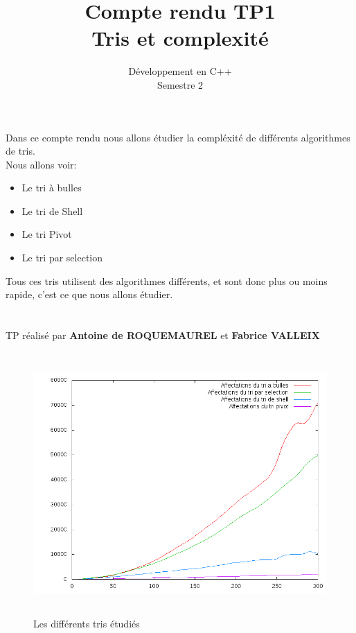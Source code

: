 \documentclass[12pt,a4paper,openany]{article}
\title{Compte rendu TP1\\ Tris et complexité}
\date{Développement en C++\\ Semestre 2\\}
\author{}
\begin{document}
	\maketitle
	Dans ce compte rendu nous allons étudier la compléxité de différents algorithmes de tris. \\	
	Nous allons voir: 
	\begin{itemize}
		\item Le tri à bulles
		\item Le tri de Shell
		\item Le tri Pivot
		\item Le tri par selection
	\end{itemize}
	Tous ces tris utilisent des algorithmes différents, et sont donc plus ou moins rapide, c'est ce que nous allons étudier.\\ \\ \\
	TP réalisé par \textbf{Antoine de ROQUEMAUREL} et \textbf{Fabrice VALLEIX}
		\begin{figure}[!h] 
			\begin{center}	\includegraphics[height=10cm]{lesquatretris.png}										
				\caption{Les différents tris étudiés}
			\end{center}
		\end{figure}
	\newpage
	
\end{document}
